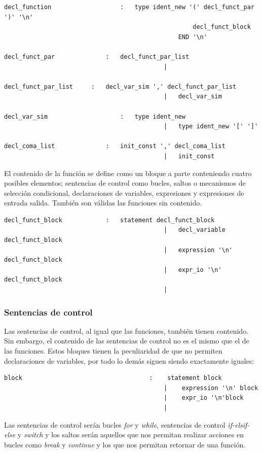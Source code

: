 \documentclass[a4paper,10pt]{article}
\begin{document}
\begin{lstlisting}
decl_function					:	type ident_new '(' decl_funct_par ')' '\n'
													decl_funct_block 
												END '\n' 
											
decl_funct_par				:	decl_funct_par_list
											| 
										
decl_funct_par_list		:	decl_var_sim ',' decl_funct_par_list
											|	decl_var_sim
											
decl_var_sim					:	type ident_new 
											|	type ident_new '[' ']' 
											
decl_coma_list				:	init_const ',' decl_coma_list 
											|	init_const 
\end{lstlisting}

El contenido de la función se define como un bloque a parte conteniendo cuatro posibles elementos; sentencias de control como bucles, saltos o mecanismos de selección condicional, declaraciones de variables, expresiones y expresiones de entrada salida. También son válidas las funciones sin contenido.

\begin{lstlisting}
decl_funct_block			:	statement decl_funct_block 
											|	decl_variable decl_funct_block 
											|	expression '\n' decl_funct_block
											|	expr_io '\n' decl_funct_block 
											|	
\end{lstlisting}

\subsubsection{Sentencias de control}
Las sentencias de control, al igual que las funciones, también tienen contenido. Sin embargo, el contenido de las sentencias de control no es el mismo que el de las funciones. Estos bloques tienen la peculiaridad de que no permiten declaraciones de variables, por todo lo demás siguen siendo exactamente iguales:

\begin{lstlisting}
block									:	 statement block
											|	 expression '\n' block
											|	 expr_io '\n'block
											| 
\end{lstlisting}

Las sentencias de control serán bucles \textit{for} y \textit{while}, sentencias de control \textit{if-elsif-else} y \textit{switch} y los saltos serán aquellos que nos permitan realizar acciones en bucles como \textit{break} y \textit{continue} y los que nos permitan retornar de una función.
\end{document}
